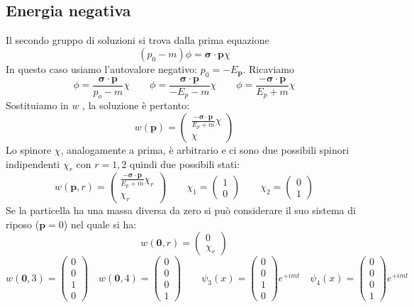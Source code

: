 \subsection{Energia negativa}
Il secondo gruppo di soluzioni si trova dalla prima equazione 
\begin{equation*}
    (p_0 - m)\phi = \boldsymbol{\sigma} \cdot \mathbf{p} \chi
\end{equation*}
In questo caso usiamo l'autovalore negativo: $p_0=-E_\mathbf{p}$. Ricaviamo 
$$
\phi = \frac{\boldsymbol{\sigma} \cdot \mathbf{p}}{p_o - m} \chi \qquad \phi = \frac{\boldsymbol{\sigma} \cdot \mathbf{p}}{-E_p - m} \chi \qquad \phi = \frac{-\boldsymbol{\sigma} \cdot \mathbf{p}}{E_p + m} \chi
$$
Sostituiamo in $w$ , la soluzione è pertanto:
$$
w(\mathbf{p}) = \begin{pmatrix} \frac{-\boldsymbol{\sigma} \cdot \mathbf{p}}{E_p + m} \chi \\ \chi \end{pmatrix}
$$
Lo spinore $\chi$, analogamente a prima, è arbitrario e ci sono due possibili spinori indipendenti $\chi_r$ con $r=1,2$ quindi due possibili stati:
$$
w(\mathbf{p}, r) = \begin{pmatrix} \frac{-\boldsymbol{\sigma} \cdot \mathbf{p}}{E_p + m} \chi_r \\ \chi_r \end{pmatrix} \qquad \chi_1 = \begin{pmatrix} 1 \\ 0 \end{pmatrix} \qquad \chi_2 = \begin{pmatrix} 0 \\ 1 \end{pmatrix}
$$
Se la particella ha una massa diversa da zero si può considerare il suo sistema di riposo ($\mathbf{p}=0$) nel quale si ha:
$$
w(\mathbf{0}, r) = \begin{pmatrix} 0 \\ \chi_r \end{pmatrix}
$$
$$
w(\mathbf{0}, 3) = \begin{pmatrix} 0 \\ 0 \\ 1 \\ 0 \end{pmatrix} \quad w(\mathbf{0}, 4) = \begin{pmatrix} 0 \\ 0 \\ 0 \\ 1 \end{pmatrix} \qquad \psi_3(x) = \begin{pmatrix} 0 \\ 0 \\ 1 \\ 0 \end{pmatrix} e^{+imt} \quad \psi_4(x) = \begin{pmatrix} 0 \\ 0 \\ 0 \\ 1 \end{pmatrix} e^{+imt}
$$
